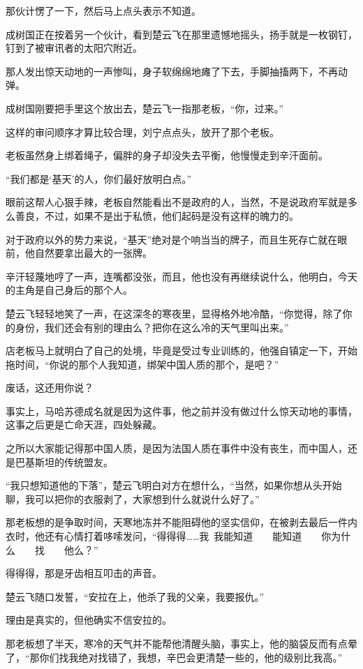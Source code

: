 那伙计愣了一下，然后马上点头表示不知道。

成树国正在按着另一个伙计，看到楚云飞在那里遗憾地摇头，扬手就是一枚钢钉，钉到了被审讯者的太阳穴附近。

那人发出惊天动地的一声惨叫，身子软绵绵地瘫了下去，手脚抽搐两下，不再动弹。

成树国刚要把手里这个放出去，楚云飞一指那老板，“你，过来。”

这样的审问顺序才算比较合理，刘宁点点头，放开了那个老板。

老板虽然身上绑着绳子，偏胖的身子却没失去平衡，他慢慢走到辛汗面前。

“我们都是‘基天’的人，你们最好放明白点。”

眼前这帮人心狠手辣，老板自然能看出不是政府的人，当然，不是说政府军就是多么善良，不过，如果不是出于私愤，他们起码是没有这样的魄力的。

对于政府以外的势力来说，“基天”绝对是个响当当的牌子，而且生死存亡就在眼前，他自然要拿出最大的一张牌。

辛汗轻蔑地哼了一声，连嘴都没张，而且，他也没有再继续说什么，他明白，今天的主角是自己身后的那个人。

楚云飞轻轻地笑了一声，在这深冬的寒夜里，显得格外地冷酷，“你觉得，除了你的身份，我们还会有别的理由么？把你在这么冷的天气里叫出来。”

店老板马上就明白了自己的处境，毕竟是受过专业训练的，他强自镇定一下，开始拖时间，“你说的那个人我知道，绑架中国人质的那个，是吧？”

废话，这还用你说？

事实上，马哈苏德成名就是因为这件事，他之前并没有做过什么惊天动地的事情，这事之后更是亡命天涯，四处躲藏。

之所以大家能记得那中国人质，是因为法国人质在事件中没有丧生，而中国人，还是巴基斯坦的传统盟友。

“我只想知道他的下落”，楚云飞明白对方在想什么，“当然，如果你想从头开始聊，我可以把你的衣服剥了，大家想到什么就说什么好了。”

那老板想的是争取时间，天寒地冻并不能阻碍他的坚实信仰，在被剥去最后一件内衣时，他还有心情打着哆嗦发问，“得得得……我~我能知道~~~~能知道~~~~你为什么~~~~找~~~~他么？”

得得得，那是牙齿相互叩击的声音。

楚云飞随口发誓，“安拉在上，他杀了我的父亲，我要报仇。”

理由是真实的，但他确实不信安拉的。

那老板想了半天，寒冷的天气并不能帮他清醒头脑，事实上，他的脑袋反而有点晕了，“那你们找我绝对找错了，我想，辛巴会更清楚一些的，他的级别比我高。”

